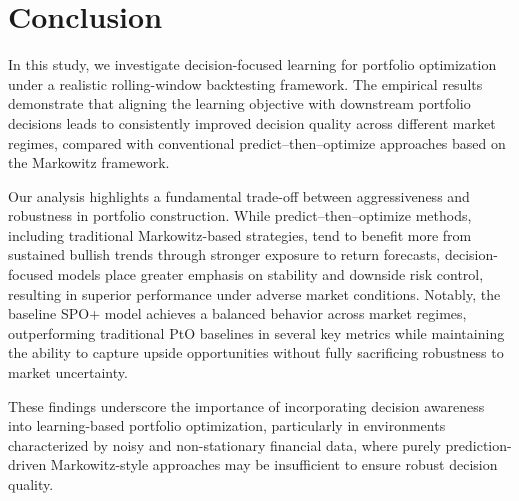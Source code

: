 \documentclass[review]{elsarticle}
\begin{document}
\section{Conclusion}

In this study, we investigate decision-focused learning for portfolio optimization under a realistic rolling-window backtesting framework.
The empirical results demonstrate that aligning the learning objective with downstream portfolio decisions leads to consistently improved decision quality across different market regimes, compared with conventional predict--then--optimize approaches based on the Markowitz framework.

Our analysis highlights a fundamental trade-off between aggressiveness and robustness in portfolio construction.
While predict--then--optimize methods, including traditional Markowitz-based strategies, tend to benefit more from sustained bullish trends through stronger exposure to return forecasts, decision-focused models place greater emphasis on stability and downside risk control, resulting in superior performance under adverse market conditions.
Notably, the baseline SPO+ model achieves a balanced behavior across market regimes, outperforming traditional PtO baselines in several key metrics while maintaining the ability to capture upside opportunities without fully sacrificing robustness to market uncertainty.

These findings underscore the importance of incorporating decision awareness into learning-based portfolio optimization, particularly in environments characterized by noisy and non-stationary financial data, where purely prediction-driven Markowitz-style approaches may be insufficient to ensure robust decision quality.
\end{document}

